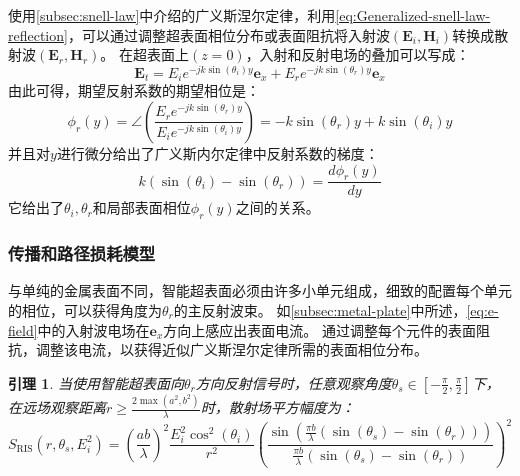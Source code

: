 \documentclass[supercite]{HustGraduPaper}
\newtheorem{lemma}{\indent 引理}[section]
\begin{document}
使用\autoref{subsec:snell-law}中介绍的广义斯涅尔定律，利用\autoref{eq:Generalized-snell-law-reflection}，可以通过调整超表面相位分布或表面阻抗将入射波$\left(\mathbf{E}_{i}, \mathbf{H}_{i}\right)$转换成散射波$\left(\mathbf{E}_{r}, \mathbf{H}_{r}\right)$。
在超表面上$(z = 0)$，入射和反射电场的叠加可以写成\cite{Asadchy_2016}：
\begin{equation}
	\mathbf{E}_{t}=E_{i} e^{-j k \sin \left(\theta_{i}\right) y} \boldsymbol{e}_{x}+E_{r} e^{-j k \sin \left(\theta_{r}\right) y} \boldsymbol{e}_{x}
\end{equation}
由此可得，期望反射系数的期望相位是：
\begin{equation}
	\phi_{r}(y)=\angle\left(\frac{E_{r} e^{-j k \sin \left(\theta_{r}\right) y}}{E_{i} e^{-j k \sin \left(\theta_{i}\right) y}}\right)=-k \sin \left(\theta_{r}\right) y+k \sin \left(\theta_{i}\right) y
\end{equation}
并且对$y$进行微分给出了广义斯内尔定律中反射系数的梯度：
\begin{equation}
	k\left(\sin \left(\theta_{i}\right)-\sin \left(\theta_{r}\right)\right)=\frac{d \phi_{r}(y)}{d y}
\end{equation}
它给出了$\theta_i,\theta_r$和局部表面相位$\phi_{r}(y)$之间的关系。

\subsubsection{传播和路径损耗模型}

与单纯的金属表面不同，智能超表面必须由许多小单元组成，细致的配置每个单元的相位，可以获得角度为$\theta_r$的主反射波束。
如\autoref{subsec:metal-plate}中所述，\autoref{eq:e-field}中的入射波电场在$\boldsymbol{e}_{x}$方向上感应出表面电流。
通过调整每个元件的表面阻抗，调整该电流，以获得近似广义斯涅尔定律所需的表面相位分布。

\begin{lemma}
	当使用智能超表面向$\theta_r$方向反射信号时，任意观察角度$\theta_{s} \in\left[-\frac{\pi}{2}, \frac{\pi}{2}\right]$下，在远场观察距离$r \geq \frac{2 \max \left(a^{2}, b^{2}\right)}{\lambda}$时，散射场平方幅度为：
	\begin{equation}
		S_{\mathrm{RIS}}\left(r, \theta_{s}, E_{i}^{2}\right) =\left(\frac{a b}{\lambda}\right)^{2} \frac{E_{i}^{2} \cos ^{2}\left(\theta_{i}\right)}{r^{2}}\left(\frac{\sin \left(\frac{\pi b}{\lambda}\left(\sin \left(\theta_{s}\right)-\sin \left(\theta_{r}\right)\right)\right)}{\frac{\pi b}{\lambda}\left(\sin \left(\theta_{s}\right)-\sin \left(\theta_{r}\right)\right)}\right)^{2}
	\end{equation}
\end{lemma}
\end{document}
